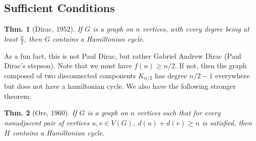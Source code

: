 \documentclass[12pt, a4paper]{book}
\newtheorem{theorem}{Thm.}[section]
\theoremstyle{nonumberplain}
\begin{document}
\begin{center}
\end{center}
\subsection{Sufficient Conditions}
\begin{theorem}[Dirac, 1952]
    If $G$ is a graph on $n$ vertices, with every degree being at least $\frac{n}{2}$, then $G$ contains a Hamiltonian cycle.
\end{theorem}
As a fun fact, this is not Paul Dirac, but rather Gabriel Andrew Dirac (Paul Dirac's stepson).
Note that we must have $f(n)\geq n/2$.
If not, then the graph composed of two disconnected components $K_{n/2}$ has degree $n/2-1$ everywhere but does not have a hamiltonian cycle.
We also have the following stronger theorem:
\begin{theorem}[Ore, 1960]
    If $G$ is a graph on $n$ vertices such that for every nonadjacent pair of vertices $u,v\in V(G)$, $d(u)+d(v)\geq n$ is satisfied, then $H$ contains a Hamiltonian cycle.
\end{theorem}
\end{document}
